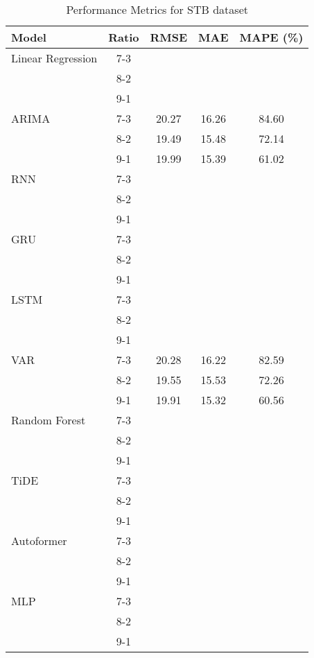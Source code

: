 \begin{table}[h!]
    \centering
    \caption{Performance Metrics for STB dataset}
    \begin{tabular}{|l|c|c|c|c|}
    \hline
    \rowcolor{orange!30} \textbf{Model} & \textbf{Ratio} & \textbf{RMSE} & \textbf{MAE} & \textbf{MAPE (\%)} \\ \hline
    \rowcolor{white} Linear Regression & 7-3 &  &  &  \\ \hline
    \rowcolor{white}  & 8-2 &  &  &  \\ \hline
    \rowcolor{white}  & 9-1 &  &  &  \\ \hline
    \rowcolor{white} ARIMA & 7-3 & 20.27 & 16.26 & 84.60 \\ \hline
    \rowcolor{white}  & 8-2 & 19.49 & 15.48 & 72.14 \\ \hline
    \rowcolor{white}  & 9-1 & 19.99 & 15.39 & 61.02 \\ \hline
    \rowcolor{white} RNN & 7-3 &  &  &  \\ \hline
    \rowcolor{white}  & 8-2 &  &  &  \\ \hline
    \rowcolor{white}  & 9-1 &  &  &  \\ \hline
    \rowcolor{green!30} GRU & 7-3 &  &  &  \\ \hline
    \rowcolor{green!30}  & 8-2 &  &  &  \\ \hline
    \rowcolor{green!30}  & 9-1 &  &  &  \\ \hline
    \rowcolor{white} LSTM & 7-3 &  &  &  \\ \hline
    \rowcolor{white}  & 8-2 &  &  &  \\ \hline
    \rowcolor{white}  & 9-1 &  &  &  \\ \hline
    \rowcolor{white} VAR & 7-3 & 20.28 & 16.22 & 82.59 \\ \hline
    \rowcolor{white}  & 8-2 & 19.55 & 15.53 & 72.26 \\ \hline
    \rowcolor{white}  & 9-1 & 19.91 & 15.32 & 60.56 \\ \hline
    \rowcolor{white} Random Forest & 7-3 &  &  &  \\ \hline
    \rowcolor{white}  & 8-2 &  &  &  \\ \hline
    \rowcolor{white}  & 9-1 &  &  &  \\ \hline
    \rowcolor{green!30} TiDE & 7-3 &  &  &  \\ \hline
    \rowcolor{green!30}  & 8-2 &  &  &  \\ \hline
    \rowcolor{green!30}  & 9-1 &  &  &  \\ \hline
    \rowcolor{white} Autoformer & 7-3 &  &  &  \\ \hline
    \rowcolor{white}  & 8-2 &  &  &  \\ \hline
    \rowcolor{white}  & 9-1 &  &  &  \\ \hline
    \rowcolor{green!30} MLP & 7-3 &  &  &  \\ \hline
    \rowcolor{green!30}  & 8-2 &  &  &  \\ \hline
    \rowcolor{green!30}  & 9-1 &  &  &  \\ \hline
    \end{tabular}
    \end{table}
